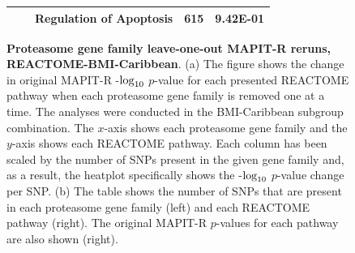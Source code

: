 \documentclass[10pt,a4paper]{article}
\def\log{{\rm log}}
\begin{document}
\begin{figure}[ht]
{{\begin{tabular}{cc|ccc}
 & & Regulation of Apoptosis & 615 & 9.42E-01 \\
  \hline
\end{tabular}}}
\caption[TBD]{\textbf{Proteasome gene family leave-one-out MAPIT-R reruns, REACTOME-BMI-Caribbean}. (a) The figure shows the change in original MAPIT-R -$\log_{10}$ $p$-value for each presented REACTOME pathway when each proteasome gene family is removed one at a time. The analyses were conducted in the BMI-Caribbean subgroup combination. The $x$-axis shows each proteasome gene family and the $y$-axis shows each REACTOME pathway. Each column has been scaled by the number of SNPs present in the given gene family and, as a result, the heatplot specifically shows the -$\log_{10}$ $p$-value change per SNP. (b) The table shows the number of SNPs that are present in each proteasome gene family (left) and each REACTOME pathway (right). The original MAPIT-R $p$-values for each pathway are also shown (right).}
\label{InterPath-Supp-Figure-Prot-Heatplots-Caribbean}
\end{figure}
\clearpage
\addtocounter{figure}{-1}
\addtocounter{CharNumber5}{1}
\end{document}

